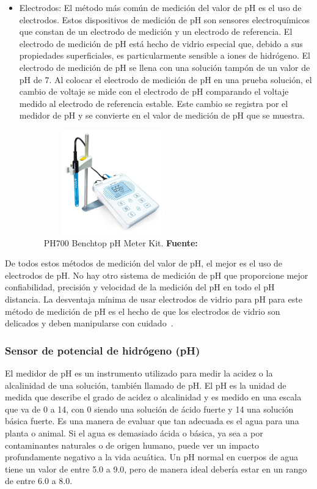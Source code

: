 \begin{itemize}
    \item Electrodos: El método más común de medición del valor de pH es el uso de electrodos.
    Estos dispositivos de medición de pH son sensores electroquímicos que constan de un electrodo de medición y un electrodo de referencia. 
    El electrodo de medición de pH está hecho de vidrio especial que, debido a sus propiedades superficiales, es particularmente sensible a iones de hidrógeno. 
    El electrodo de medición de pH se llena con una solución tampón de un valor de pH de 7. 
    Al colocar el electrodo de medición de pH en una prueba soluci\'on, el cambio de voltaje se mide con el electrodo de pH comparando el voltaje medido al electrodo de referencia estable. 
    Este cambio se registra por el medidor de pH y se convierte en el valor de medición de pH que se muestra.
    
\begin{figure}[ht]
    \centering
    \includegraphics[width=60mm, height=45mm]{Imagenes/cap2/ph700.png}
    \caption {PH700 Benchtop pH Meter Kit. \textbf{Fuente:}
    \cite{ph700_nodate} }
    \label{fig:ph700}
    \end{figure}
\end{itemize}

De todos estos métodos de medición del valor de pH,  el mejor es el uso de electrodos de pH. 
No hay otro sistema de medición de pH que proporcione mejor confiabilidad, precisión y velocidad de la medición del pH en todo el pH distancia. 
La desventaja mínima de usar electrodos de vidrio para pH para este método de medición de pH es el hecho de que los electrodos de vidrio son delicados y deben manipularse con cuidado~\cite{li_chapter_2019}.

\subsubsection{Sensor de potencial de hidrógeno (pH)}

El medidor de pH es un instrumento utilizado para medir la acidez o la alcalinidad de una solución, también llamado de pH. El pH es la unidad de medida que describe el grado de acidez o alcalinidad y es medido en una escala que va de 0 a 14, con 0 siendo una solución de ácido fuerte y 14 una solución básica fuerte.
Es una manera de evaluar que tan adecuada es el agua para una planta o animal.  Si el agua es demasiado ácida o básica, ya sea a por contaminantes naturales o de origen humano, puede ver un impacto profundamente negativo a la vida acuática.  Un pH normal en cuerpos de agua tiene un valor de entre 5.0 a 9.0, pero de manera ideal debería estar en un rango de entre 6.0 a 8.0. %

